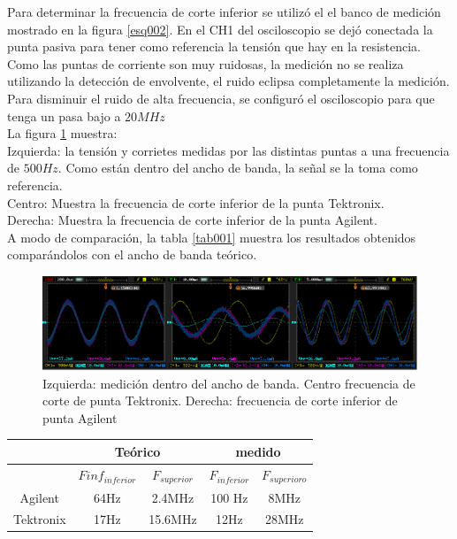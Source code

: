 \documentclass[a4paper,10pt]{article}
\begin{document}
		\indent Para determinar la frecuencia de corte inferior se utilizó el
		el banco de medición mostrado en la figura \ref{esq002}. En el CH1 del
		osciloscopio se dejó conectada la punta pasiva para tener como 
		referencia la tensión que hay en la resistencia. \\
		\indent Como las puntas de corriente son muy ruidosas, la medición no
		se realiza utilizando la detección de envolvente, el ruido eclipsa 
		completamente la medición. Para disminuir el ruido de alta frecuencia,
		se configuró el osciloscopio para que tenga un pasa bajo a $20 MHz$\\
%

		\indent La figura \ref{img009} muestra:  \\
		\indent Izquierda: la tensión y corrietes medidas por las distintas 
		puntas a una frecuencia de $500Hz$. Como están dentro del ancho de 
		banda, la señal se la toma como referencia. \\
		\indent Centro: Muestra la frecuencia de corte inferior de la punta 
		Tektronix. \\
		\indent Derecha: Muestra la frecuencia de corte inferior de la punta 
		Agilent.\\
		\indent A modo de comparación, la tabla \ref{tab001} muestra los 
		resultados obtenidos comparándolos con el ancho de banda teórico.
		
		\begin{figure}[!htb]
			\centering
			\includegraphics[width=12cm]
	 		{Imagenes/Mediciones instrumentos/frecCortePuntaCorriente.png}
			\caption{Izquierda: medición dentro del ancho de banda. Centro 
			frecuencia de corte de punta Tektronix. Derecha: frecuencia de corte
			inferior de punta Agilent}
		    \label{img009}
		\end{figure}
	
		\begin{table}
		\begin{tabular}{|c|c|c|c|c|}
			\hline
			 & \multicolumn{2}{|c|}{Teórico} & \multicolumn{2}{|c|}{medido} \\
			\hline
			& $Finf_{inferior}$ & $F_{superior}$ & $F_{inferior}$ & 
			$F_{superioro}$ \\
			\hline
			Agilent & 64Hz  & 2.4MHz  & 100 Hz & 8MHz \\
			\hline
			Tektronix & 17Hz & 15.6MHz  & 12Hz  & 28MHz \\
			\hline
		\end{tabular}
		\end{table}
\end{document}
